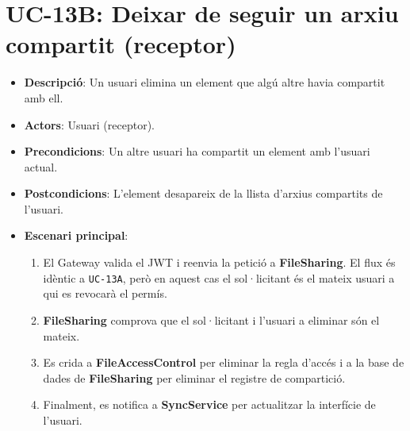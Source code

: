 \section{UC-13B: Deixar de seguir un arxiu compartit (receptor)}
\begin{itemize}
    \item \textbf{Descripció}: Un usuari elimina un element que algú altre havia compartit amb ell.
    \item \textbf{Actors}: Usuari (receptor).
    \item \textbf{Precondicions}: Un altre usuari ha compartit un element amb l'usuari actual.
    \item \textbf{Postcondicions}: L'element desapareix de la llista d'arxius compartits de l'usuari.
    \item \textbf{Escenari principal}:
    \begin{enumerate}
        \item El Gateway valida el JWT i reenvia la petició a \textbf{FileSharing}. El flux és idèntic a \texttt{UC-13A}, però en aquest cas el sol·licitant és el mateix usuari a qui es revocarà el permís.
        \item \textbf{FileSharing} comprova que el sol·licitant i l'usuari a eliminar són el mateix.
        \item Es crida a \textbf{FileAccessControl} per eliminar la regla d'accés i a la base de dades de \textbf{FileSharing} per eliminar el registre de compartició.
        \item Finalment, es notifica a \textbf{SyncService} per actualitzar la interfície de l'usuari.
    \end{enumerate}
\end{itemize}

